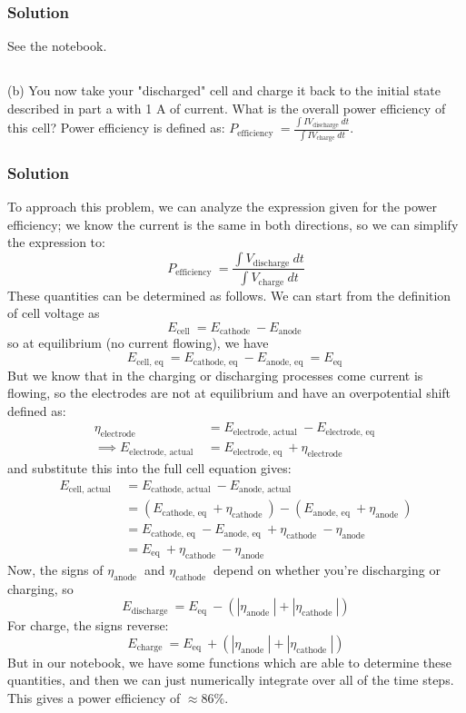 \documentclass[12pt]{article}
\begin{document}
\subsubsection{Solution}
See the notebook.
\subsection{}
(b) You now take your "discharged" cell and charge it back to the initial state described in part a with 1 A of current. What is the overall power efficiency of this cell? Power efficiency is defined as: $P_{\text {efficiency }}=\frac{\int I V_{\text {discharge }} d t}{\int I V_{\text {charge }} d t}$.
\subsubsection{Solution}
To approach this problem, we can analyze the expression given for the power efficiency; we know the current is the same in both directions, so we can simplify the expression to:
\begin{equation}
P_{\text {efficiency }}=\frac{\int V_{\text {discharge }} d t}{\int V_{\text {charge }} d t}
\end{equation}
These quantities can be determined as follows. We can start from the definition of cell voltage as
$$
E_{\text {cell }}=E_{\text {cathode }}-E_{\text {anode }}
$$
so at equilibrium (no current flowing), we have
$$
E_{\text {cell, eq }}=E_{\text {cathode, eq }}-E_{\text {anode, eq }}=E_{\text {eq }}
$$
But we know that in the charging or discharging processes come current is flowing, so the electrodes are not at equilibrium and have an overpotential shift defined as:
\begin{align}
    \eta_{\text {electrode }}&=E_{\text {electrode, actual }}-E_{\text {electrode, eq }}\\
    \implies E_{\text {electrode, actual }}&=E_{\text {electrode, eq }}+\eta_{\text {electrode }}
\end{align}
and substitute this into the full cell equation  gives:
\begin{align}
E_{\text {cell, actual }}&=E_{\text {cathode, actual }}-E_{\text {anode, actual }}\\
&=\left(E_{\text {cathode, eq }}+\eta_{\text {cathode }}\right)-\left(E_{\text {anode, eq }}+\eta_{\text {anode }}\right) \\
&=E_{\text {cathode, eq }}-E_{\text {anode, eq }}+\eta_{\text {cathode }}-\eta_{\text {anode }} \\
&= E_{\text {eq }} + \eta_{\text {cathode }} - \eta_{\text {anode }}
\end{align}
Now, the signs of $\eta_{\text {anode }}$ and $\eta_{\text {cathode }}$ depend on whether you're discharging or charging, so
$$
E_{\text {discharge }}=E_{\text {eq }}-\left(\left|\eta_{\text {anode }}\right|+\left|\eta_{\text {cathode }}\right|\right)
$$
For charge, the signs reverse:
$$
E_{\text {charge }}=E_{\text {eq }}+\left(\left|\eta_{\text {anode }}\right|+\left|\eta_{\text {cathode }}\right|\right)
$$
But in our notebook, we have some functions which are able to determine these quantities, and then we can just numerically integrate over all of the time steps. This gives a power efficiency of $\approx 86 \%$.
\end{document}

